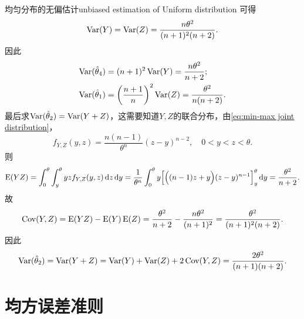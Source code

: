 \begin{example}{均匀分布的无偏估计}{unbiased estimation of Uniform distribution}
	可得 
	\begin{equation}
		\operatorname{Var}(Y)=\operatorname{Var}(Z)=\frac{n\theta^2}{(n+1)^2(n+2)}.
	\end{equation}
	因此
	\begin{align*}
		\operatorname{Var}(\hat\theta_4)&=(n+1)^2\operatorname{Var}(Y)=\frac{n\theta^2}{n+2};\\
		\operatorname{Var}(\hat\theta_1)&=\biggl(\frac{n+1}n\biggr)^2\operatorname{Var}(Z)=\frac{\theta^2}{n(n+2)}.
	\end{align*}
	最后求$\operatorname{Var}(\hat\theta_2)=\operatorname{Var}(Y+Z)$，这需要知道$Y,Z$的联合分布，由\eqref{eq:min-max joint distribution}，
	\begin{equation}
		f_{Y,Z}(y,z)=\frac{n(n-1)}{\theta^n}(z-y)^{n-2},\quad 0<y<z<\theta.
	\end{equation}
	则
	\[
		\operatorname{E}(YZ)=\int_0^\theta\int_y^\theta yzf_{Y,Z}(y,z)\mathop{}\!\mathrm{d} z\mathop{}\!\mathrm{d} y=\frac1{\theta^n}\int_0^\theta y\Bigl[\Bigl((n-1)z+y\Bigr)(z-y)^{n-1}\Bigr]_y^\theta\mathop{}\!\mathrm{d} y=\frac{\theta^2}{n+2}.
	\]
	故
	\begin{equation}
		\operatorname{Cov}(Y,Z)=\operatorname{E}(YZ)-\operatorname{E}(Y)\operatorname{E}(Z)=\frac{\theta^2}{n+2}-\frac{n\theta^2}{(n+1)^2}=\frac{\theta^2}{(n+1)^2(n+2)}.
	\end{equation}
	因此
	\[
		\operatorname{Var}(\hat\theta_2)=\operatorname{Var}(Y+Z)=\operatorname{Var}(Y)+\operatorname{Var}(Z)+2\operatorname{Cov}(Y,Z)=\frac{2\theta^2}{(n+1)(n+2)}.
	\]
\end{example}

\section{均方误差准则}

